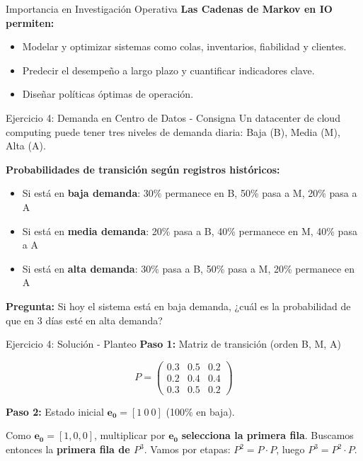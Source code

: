 \documentclass{beamer}
\begin{document}
\begin{frame}{Importancia en Investigación Operativa}
    \small
    \textbf{Las Cadenas de Markov en IO permiten:}
    \begin{itemize}
        \item Modelar y optimizar sistemas como colas, inventarios, fiabilidad y clientes.
        \item Predecir el desempeño a largo plazo y cuantificar indicadores clave.
        \item Diseñar políticas óptimas de operación.
    \end{itemize}
\end{frame}


\begin{frame}{Ejercicio 4: Demanda en Centro de Datos - Consigna}
    \small
    Un datacenter de cloud computing puede tener tres niveles de demanda diaria: Baja (B), Media (M), Alta (A).

    \vspace{0.5em}

    \textbf{Probabilidades de transición según registros históricos:}
    \begin{itemize}
        \item Si está en \textbf{baja demanda}: 30\% permanece en B, 50\% pasa a M, 20\% pasa a A
        \item Si está en \textbf{media demanda}: 20\% pasa a B, 40\% permanece en M, 40\% pasa a A
        \item Si está en \textbf{alta demanda}: 30\% pasa a B, 50\% pasa a M, 20\% permanece en A
    \end{itemize}

    \vspace{0.5em}

    \textbf{Pregunta:} Si hoy el sistema está en baja demanda, ¿cuál es la probabilidad de que en 3 días esté en alta demanda?
\end{frame}

\begin{frame}{Ejercicio 4: Solución - Planteo}
    \small
    \textbf{Paso 1:} Matriz de transición (orden B, M, A)

    \[P = \begin{pmatrix}
    0.3 & 0.5 & 0.2 \\
    0.2 & 0.4 & 0.4 \\
    0.3 & 0.5 & 0.2
    \end{pmatrix}\]

    \textbf{Paso 2:} Estado inicial $\mathbf{e_0} = [1\ 0\ 0]$ (100\% en baja).

    \vspace{0.5em}

    Como $\mathbf{e_0} = [1,0,0]$, multiplicar por $\mathbf{e_0}$ \textbf{selecciona la primera fila}. Buscamos entonces la \textbf{primera fila de $P^3$}. Vamos por etapas: $P^2 = P\cdot P$, luego $P^3 = P^2 \cdot P$.
\end{frame}
\end{document}
